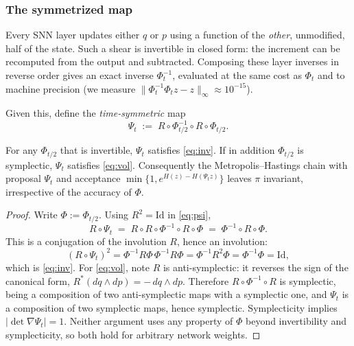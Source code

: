\subsubsection{The symmetrized map}

Every SNN layer updates either $q$ or $p$ using a function of the
\emph{other}, unmodified, half of the state. Such a shear is invertible in
closed form: the increment can be recomputed from the output and subtracted.
Composing these layer inverses in reverse order gives an exact inverse
$\Phi_t^{-1}$, evaluated at the same cost as $\Phi_t$ and to machine precision
(we measure $\|\Phi_t^{-1}\Phi_t z - z\|_\infty \approx 10^{-15}$).

Given this, define the \emph{time-symmetric} map
\begin{equation}
    \Psi_t \;:=\; R \circ \Phi_{t/2}^{-1} \circ R \circ \Phi_{t/2}.
    \label{eq:psi}
\end{equation}

\begin{proposition}
\label{prop:involution}
For any $\Phi_{t/2}$ that is invertible, $\Psi_t$ satisfies \eqref{eq:inv}.
If in addition $\Phi_{t/2}$ is symplectic, $\Psi_t$ satisfies \eqref{eq:vol}.
Consequently the Metropolis--Hastings chain with proposal $\Psi_t$ and
acceptance $\min\{1, e^{H(z)-H(\Psi_t z)}\}$ leaves $\pi$ invariant,
irrespective of the accuracy of $\Phi$.
\end{proposition}

\begin{proof}
Write $\Phi := \Phi_{t/2}$. Using $R^2 = \mathrm{Id}$ in \eqref{eq:psi},
\begin{equation*}
    R \circ \Psi_t \;=\; R \circ R \circ \Phi^{-1} \circ R \circ \Phi
                  \;=\; \Phi^{-1} \circ R \circ \Phi .
\end{equation*}
This is a conjugation of the involution $R$, hence an involution:
\begin{equation*}
    (R \circ \Psi_t)^2
      = \Phi^{-1} R \Phi \, \Phi^{-1} R \Phi
      = \Phi^{-1} R^2 \Phi
      = \Phi^{-1}\Phi = \mathrm{Id},
\end{equation*}
which is \eqref{eq:inv}. For \eqref{eq:vol}, note $R$ is anti-symplectic: it
reverses the sign of the canonical form, $R^{*}(dq \wedge dp) = -\,dq\wedge dp$.
Therefore $R \circ \Phi^{-1} \circ R$ is symplectic, being a composition of two
anti-symplectic maps with a symplectic one, and $\Psi_t$ is a composition of
two symplectic maps, hence symplectic. Symplecticity implies
$|\det \nabla \Psi_t| = 1$. Neither argument uses any property of $\Phi$
beyond invertibility and symplecticity, so both hold for arbitrary network
weights.
\end{proof}

